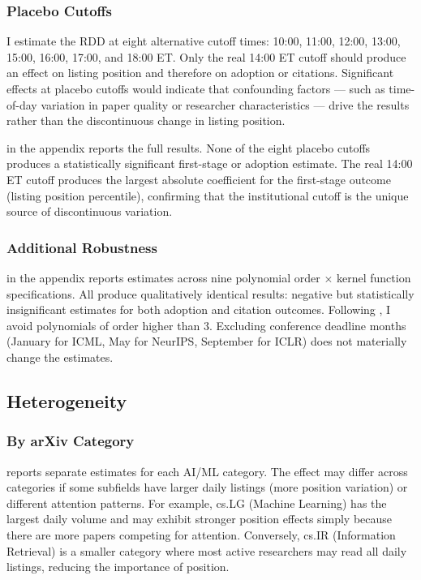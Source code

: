 \documentclass[12pt]{article}
\begin{document}
\subsubsection{Placebo Cutoffs}

I estimate the RDD at eight alternative cutoff times: 10:00, 11:00, 12:00, 13:00, 15:00, 16:00, 17:00, and 18:00 ET. Only the real 14:00 ET cutoff should produce an effect on listing position and therefore on adoption or citations. Significant effects at placebo cutoffs would indicate that confounding factors --- such as time-of-day variation in paper quality or researcher characteristics --- drive the results rather than the discontinuous change in listing position.

 in the appendix reports the full results. None of the eight placebo cutoffs produces a statistically significant first-stage or adoption estimate. The real 14:00 ET cutoff produces the largest absolute coefficient for the first-stage outcome (listing position percentile), confirming that the institutional cutoff is the unique source of discontinuous variation.


\subsubsection{Additional Robustness}

 in the appendix reports estimates across nine polynomial order $\times$ kernel function specifications. All produce qualitatively identical results: negative but statistically insignificant estimates for both adoption and citation outcomes. Following \citet{gelman2019}, I avoid polynomials of order higher than 3. Excluding conference deadline months (January for ICML, May for NeurIPS, September for ICLR) does not materially change the estimates.

\subsection{Heterogeneity}

\subsubsection{By arXiv Category}

 reports separate estimates for each AI/ML category. The effect may differ across categories if some subfields have larger daily listings (more position variation) or different attention patterns. For example, cs.LG (Machine Learning) has the largest daily volume and may exhibit stronger position effects simply because there are more papers competing for attention. Conversely, cs.IR (Information Retrieval) is a smaller category where most active researchers may read all daily listings, reducing the importance of position.
\end{document}
